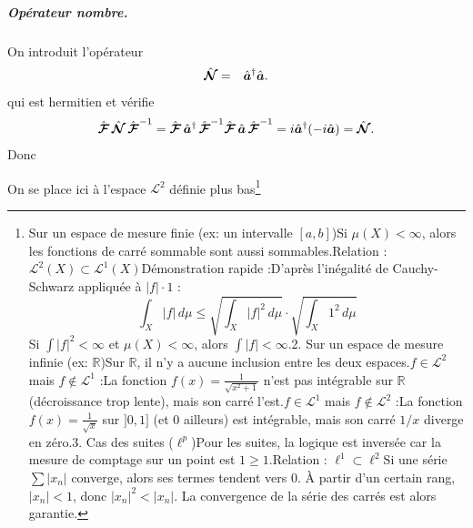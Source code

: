 \subparagraph{Opérateur nombre.}
On introduit l'opérateur 
\begin{eqnarray}
    \hat{\bm{\mathcal N}} & = &  \hat{\bm{a}}^\dag  \hat{\bm{a}}.
\end{eqnarray}
qui est hermitien et vérifie 
\begin{eqnarray}
    \hat{\bm{\mathcal{F}}} \,\hat{\bm{\mathcal N}} \, \hat{\bm{\mathcal{F}}}^{-1} =  \hat{\bm{\mathcal{F}}} \,\hat{\bm{a}}^\dag \, \hat{\bm{\mathcal{F}}}^{-1} \hat{\bm{\mathcal{F}}} \,\hat{\bm{a}} \, \hat{\bm{\mathcal{F}}}^{-1} = i \hat{\bm{a}}^\dag ( - i \hat{\bm{a}})  = \hat{\bm{\mathcal N}}.
\end{eqnarray}
Donc 

\medskip
On se place ici à l'espace $\mathcal L^2$ définie plus bas\footnote{
    Sur un espace de mesure finie (ex: un intervalle $[a, b]$)Si $\mu(X) < \infty$, alors les fonctions de carré sommable sont aussi sommables.Relation : $\mathcal{L}^2(X) \subset \mathcal{L}^1(X)$Démonstration rapide :D'après l'inégalité de Cauchy-Schwarz appliquée à $|f| \cdot 1$ :$$\int_X |f| \, d\mu \leq \sqrt{\int_X |f|^2 \, d\mu} \cdot \sqrt{\int_X 1^2 \, d\mu}$$Si $\int |f|^2 < \infty$ et $\mu(X) < \infty$, alors $\int |f| < \infty$.2. Sur un espace de mesure infinie (ex: $\mathbb{R}$)Sur $\mathbb{R}$, il n'y a aucune inclusion entre les deux espaces.$f \in \mathcal{L}^2$ mais $f \notin \mathcal{L}^1$ :La fonction $f(x) = \frac{1}{\sqrt{x^2+1}}$ n'est pas intégrable sur $\mathbb{R}$ (décroissance trop lente), mais son carré l'est.$f \in \mathcal{L}^1$ mais $f \notin \mathcal{L}^2$ :La fonction $f(x) = \frac{1}{\sqrt{x}}$ sur $]0, 1]$ (et 0 ailleurs) est intégrable, mais son carré $1/x$ diverge en zéro.3. Cas des suites ($\ell^p$)Pour les suites, la logique est inversée car la mesure de comptage sur un point est $1 \geq 1$.Relation : $\ell^1 \subset \ell^2$Si une série $\sum |x_n|$ converge, alors ses termes tendent vers 0. À partir d'un certain rang, $|x_n| < 1$, donc $|x_n|^2 < |x_n|$. La convergence de la série des carrés est alors garantie.
}
